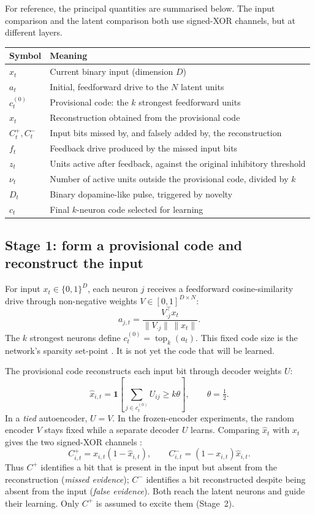 \documentclass[11pt,a4paper]{article}
\newcommand{\topk}{\operatorname{top}_k}
\begin{document}
For reference, the principal quantities are summarised below. The input comparison and the latent comparison both use signed-XOR channels, but at different layers.
\begin{center}
\small
\begin{tabularx}{\textwidth}{@{}P{2.5cm}L@{}}
\toprule
Symbol & Meaning \\
\midrule
$x_t$ & Current binary input (dimension $D$) \\
$a_t$ & Initial, feedforward drive to the $N$ latent units \\
$c^{(0)}_t$ & Provisional code: the $k$ strongest feedforward units \\
$\hat x_t$ & Reconstruction obtained from the provisional code \\
$C^+_t, C^-_t$ & Input bits missed by, and falsely added by, the reconstruction \\
$f_t$ & Feedback drive produced by the missed input bits \\
$z_t$ & Units active after feedback, against the original inhibitory threshold \\
$\nu_t$ & Number of active units outside the provisional code, divided by $k$ \\
$D_t$ & Binary dopamine-like pulse, triggered by novelty \\
$c_t$ & Final $k$-neuron code selected for learning \\
\bottomrule
\end{tabularx}
\end{center}

\subsection{Stage 1: form a provisional code and reconstruct the input}
For input $x_t\in\{0,1\}^D$, each neuron $j$ receives a feedforward cosine-similarity drive through non-negative weights $V\in[0,1]^{D\times N}$:
\[
a_{j,t}=\frac{V_{\cdot j}^{\top}x_t}{\|V_{\cdot j}\|\,\|x_t\|}.
\]
The $k$ strongest neurons define $c^{(0)}_t=\topk(a_t)$. This fixed code size is the network's sparsity set-point \citep{marco2024worms}. It is not yet the code that will be learned.

The provisional code reconstructs each input bit through decoder weights $U$:
\[
\hat x_{i,t}=\mathbf 1\!\left[\sum_{j\in c^{(0)}_t}U_{ij}\ge k\theta\right],\qquad\theta=\tfrac12.
\]
In a \emph{tied} autoencoder, $U=V$. In the frozen-encoder experiments, the random encoder $V$ stays fixed while a separate decoder $U$ learns. Comparing $\hat x_t$ with $x_t$ gives the two signed-XOR channels \citep{pena2026loss}:
\[
C^+_{i,t}=x_{i,t}(1-\hat x_{i,t}),\qquad
C^-_{i,t}=(1-x_{i,t})\hat x_{i,t}.
\]
Thus $C^+$ identifies a bit that is present in the input but absent from the reconstruction (\emph{missed evidence}); $C^-$ identifies a bit reconstructed despite being absent from the input (\emph{false evidence}). Both reach the latent neurons and guide their learning. Only $C^+$ is assumed to excite them (Stage~2).
\end{document}
